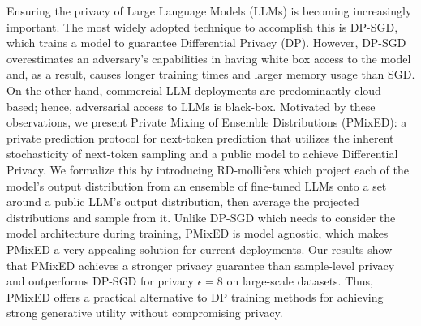 Ensuring the privacy of Large Language Models (LLMs) is becoming increasingly important. The most widely adopted technique to accomplish this is DP-SGD, which trains a model to guarantee Differential Privacy (DP). However, DP-SGD overestimates an adversary's capabilities in having white box access to the model and, as a result, causes longer training times and larger memory usage than SGD. On the other hand, commercial LLM deployments are predominantly cloud-based; hence, adversarial access to LLMs is black-box. Motivated by these observations, we present Private Mixing of Ensemble Distributions (PMixED): a private prediction protocol for next-token prediction that utilizes the inherent stochasticity of next-token sampling and a public model to achieve Differential Privacy. We formalize this by introducing RD-mollifers which project each of the model's output distribution from an ensemble of fine-tuned LLMs onto a set around a public LLM's output distribution, then average the projected distributions and sample from it. Unlike DP-SGD which needs to consider the model architecture during training, PMixED is model agnostic, which makes PMixED a very appealing solution for current deployments. Our results show that PMixED achieves a stronger privacy guarantee than sample-level privacy and outperforms DP-SGD for privacy $\epsilon = 8$ on large-scale datasets. Thus, PMixED offers a practical alternative to DP training methods for achieving strong generative utility without compromising privacy.